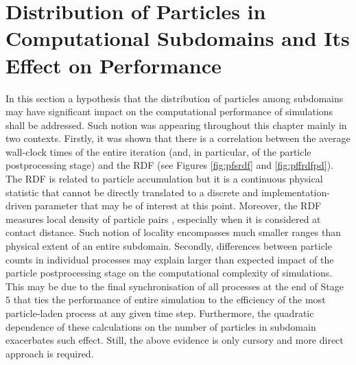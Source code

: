\documentclass{pracamgren}
\begin{document}
 

\section{Distribution of Particles in Computational Subdomains and Its Effect on Performance}
\label{sc:ch3.perfp}


In this section a hypothesis that the distribution of particles among subdomains may have significant impact on the computational performance of simulations shall be addressed.
Such notion was appearing throughout this chapter mainly in two contexts.
Firstly, it was shown that there is a correlation between the average wall-clock times of the entire iteration (and, in particular, of the particle postprocessing stage) and the RDF (see Figures \ref{fig:pfsrdf} and \ref{fig:pffrdfpd}).
The RDF is related to particle accumulation but it is a continuous physical statistic that cannot be directly translated to a discrete and implementation-driven parameter that may be of interest at this point.
Moreover, the RDF measures local density of particle pairs \parencite{Grabowski2013}, especially when it is considered at contact distance.
Such notion of locality encompasses much smaller ranges than physical extent of an entire subdomain.   
Secondly, differences between particle counts in individual processes may explain larger than expected impact of the particle postprocessing stage on the computational complexity of simulations.
This may be due to the final synchronisation of all processes at the end of Stage $5$ that ties the performance of entire simulation to the efficiency of the most particle-laden process at any given time step.
Furthermore, the quadratic dependence of these calculations on the number of particles in subdomain exacerbates such effect.
Still, the above evidence is only cursory and more direct approach is required.
\end{document}
